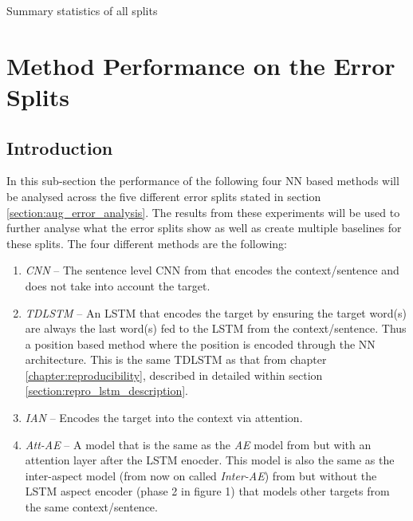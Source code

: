 \begin{table}[!ht]
    \centering
    
    \caption{Summary statistics of all splits}
    \label{table:aug_error_analysis_summary_stats}
\end{table}

\FloatBarrier
\section{Method Performance on the Error Splits}
\subsection{Introduction}
\label{section:aug_method_performance_intro}
In this sub-section the performance of the following four NN based methods will be analysed across the five different error splits stated in section \ref{section:aug_error_analysis}. The results from these experiments will be used to further analyse what the error splits show as well as create multiple baselines for these splits. The four different methods are the following: 
\begin{enumerate}
    \item \textit{CNN} -- The sentence level CNN from \citet{kim-2014-convolutional} that encodes the context/sentence and does not take into account the target.
    \item \textit{TDLSTM} \citep{tang-etal-2016-effective} -- An LSTM that encodes the target by ensuring the target word(s) are always the last word(s) fed to the LSTM from the context/sentence. Thus a position based method where the position is encoded through the NN architecture. This is the same TDLSTM as that from chapter \ref{chapter:reproducibility}, described in detailed within section \ref{section:repro_lstm_description}.
    \item \textit{IAN} \citep{ma2017interactive} -- Encodes the target into the context via attention.
    \item \textit{Att-AE} -- A model that is the same as the \textit{AE} model from \citet{wang-etal-2016-attention} but with an attention layer after the LSTM enocder. This model is also the same as the inter-aspect model (from now on called \textit{Inter-AE}) from \citet{hazarika-etal-2018-modeling} but without the LSTM aspect encoder (phase 2 in figure 1) that models other targets from the same context/sentence.  
\end{enumerate}
